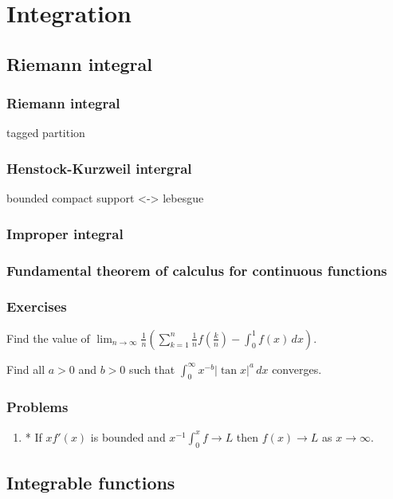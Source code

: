\documentclass{../note}
\begin{document}
\part{Integration}

\chapter{Riemann integral}
\section{Riemann integral}
tagged partition
\section{Henstock-Kurzweil intergral}
bounded compact support <-> lebesgue
\section{Improper integral}
\section{Fundamental theorem of calculus for continuous functions}

\section*{Exercises}
\begin{prb}
Find the value of $\lim_{n\to\infty}\frac1n\left(\sum_{k=1}^n\frac1nf\left(\frac kn\right)-\int_0^1f(x)\,dx\right)$.
\end{prb}

\begin{prb}
Find all $a>0$ and $b>0$ such that $\int_0^\infty x^{-b}|\tan x|^a\,dx$ converges.
\end{prb}

\section*{Problems}
\begin{enumerate}
\item* If $xf'(x)$ is bounded and $x^{-1}\int_0^xf\to L$ then $f(x)\to L$ as $x\to\infty$.
\end{enumerate}


\chapter{Integrable functions}
\end{document}
